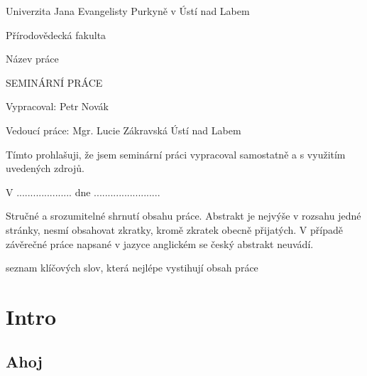 \documentclass[12pt,a4paper,oneside]{article}
\begin{document}
\pagestyle{empty} %

\begin{center}
\Large
Univerzita Jana Evangelisty Purkyně
v Ústí nad Labem

Přírodovědecká fakulta

\vspace*{\fill}

\Huge
Název práce

\Large
SEMINÁRNÍ PRÁCE

\vspace{4em} %
\vspace*{\fill}

\end{center}

{\setlength\parindent{0pt} %
Vypracoval: Petr Novák

Vedoucí práce: Mgr. Lucie Zákravská
\hfill Ústí nad Labem \the\year}

\clearpage

\vspace*{\fill}

Tímto prohlašuji, že jsem seminární práci vypracoval samostatně
a s využitím uvedených zdrojů. %

V .................... dne ........................
   
\hspace{8.5cm} \makebox[2in]{\hrulefill}
  				 
\hspace{8.5cm} 	

\clearpage

{
	\abstract
	\noindent
	Stručné a srozumitelné shrnutí obsahu práce. Abstrakt je nejvýše v rozsahu
	jedné stránky, nesmí obsahovat zkratky, kromě zkratek obecně přijatých. V
	případě závěrečné práce napsané v jazyce anglickém se český abstrakt
	neuvádí.
}

{
	\renewcommand{\abstractname}{Klíčová slova}
	\abstract
	\noindent
	seznam klíčových slov, která nejlépe vystihují obsah práce
}

\clearpage

\tableofcontents
\clearpage

\pagestyle{fancy}
% 
\section{Intro}
\subsection{Ahoj}

\printbibliography
\end{document}
